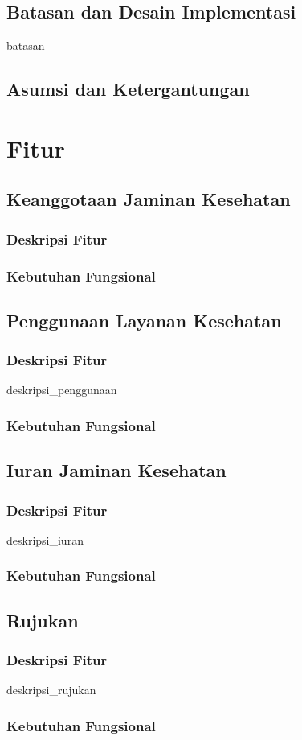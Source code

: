 \documentclass[12pt, a4paper, oneside]{book}
\begin{document}
	\section{Batasan dan Desain Implementasi}
		 {batasan}
	\section{Asumsi dan Ketergantungan}
		
	\pagebreak
	\chapter{Fitur}	
	\section{Keanggotaan Jaminan Kesehatan}
	\subsection{Deskripsi Fitur}
		
	\subsection{Kebutuhan Fungsional}
		
	\section{Penggunaan Layanan Kesehatan}
	\subsection{Deskripsi Fitur}
		 {deskripsi_penggunaan}
	\subsection{Kebutuhan Fungsional}
		
	\section{Iuran Jaminan Kesehatan}
	\subsection{Deskripsi Fitur}
		 {deskripsi_iuran}
	\subsection{Kebutuhan Fungsional}
		
	\section{Rujukan}
	\subsection{Deskripsi Fitur}
		 {deskripsi_rujukan}
	\subsection{Kebutuhan Fungsional}
		
\end{document}
